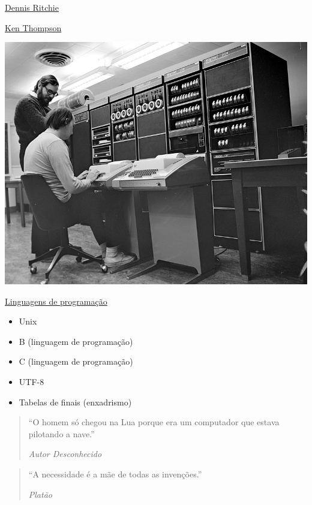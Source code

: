\begin{multicols}{3}
\vfill\null
\pagebreak				

\href{https://pt.wikipedia.org/wiki/Dennis_Ritchie}{Dennis Ritchie}

\href{https://pt.wikipedia.org/wiki/Ken_Thompson}{Ken Thompson}


\includegraphics[width=.8\linewidth]{./IMG-GIT/CIENTISTAS/Ken_Thompson_(sitting)_and_Dennis_Ritchie_at_PDP-11_(2876612463).jpg}

\vfill
\columnbreak

\href{https://pt.wikipedia.org/wiki/Linguagem_de_programa\%C3\%A7\%C3\%A3o}{Linguagens de programação}

\begin{itemize}
	\item Unix
	\item B (linguagem de programação)
	\item C (linguagem de programação)
	\item UTF-8
	\item Tabelas de finais (enxadrismo)
\end{itemize}
\end{multicols}

\vfill\null
\pagebreak

\begin{multicols}{2}
	\begin{quote}
	``O homem só chegou na Lua porque era um computador que estava pilotando a nave.'' \\
\begin{flushright}
		\textit{Autor Desconhecido}
\end{flushright}
\end{quote}

\vfill
\columnbreak

\begin{quote}
	``A necessidade é a mãe de todas as invenções.'' \\
	\begin{flushright}
		\textit{Platão}
	\end{flushright}
\end{quote}
\end{multicols}


